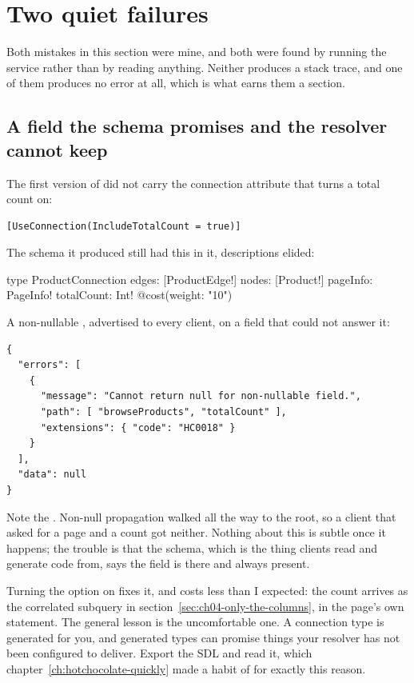 \section{Two quiet failures}
\label{sec:ch04-two-quiet-failures}

Both mistakes in this section were mine, and both were found by running the
service rather than by reading anything. Neither produces a stack trace, and one
of them produces no error at all, which is what earns them a section.

\subsection*{A field the schema promises and the resolver cannot keep}

%
The first version of  did not carry the connection
attribute that turns a total count on:

\begin{verbatim}
[UseConnection(IncludeTotalCount = true)]
\end{verbatim}

The schema it produced still had this in it, descriptions elided:

\begin{graphqlsdl}
type ProductConnection {
  edges: [ProductEdge!]
  nodes: [Product!]
  pageInfo: PageInfo!
  totalCount: Int! @cost(weight: "10")
}
\end{graphqlsdl}

A non-nullable , advertised to every client, on a field that
could not answer it:

\begin{verbatim}
{
  "errors": [
    {
      "message": "Cannot return null for non-nullable field.",
      "path": [ "browseProducts", "totalCount" ],
      "extensions": { "code": "HC0018" }
    }
  ],
  "data": null
}
\end{verbatim}

Note the . Non-null propagation walked all the way to the
root, so a client that asked for a page and a count got neither. Nothing about
this is subtle once it happens; the trouble is that the schema, which is the
thing clients read and generate code from, says the field is there and always
present.

Turning the option on fixes it, and costs less than I expected: the count
arrives as the correlated subquery in
section~\ref{sec:ch04-only-the-columns}, in the page's own statement. The
general lesson is the uncomfortable one. A connection type is generated for you,
and generated types can promise things your resolver has not been configured to
deliver. Export the SDL and read it, which chapter~\ref{ch:hotchocolate-quickly}
made a habit of for exactly this reason.

